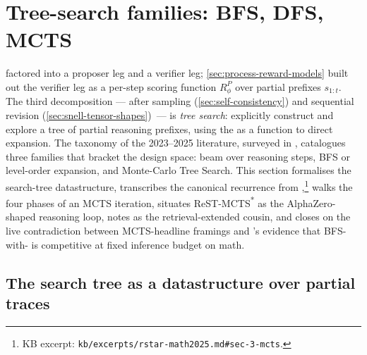 
\section{Tree-search families: BFS, DFS, MCTS}
\label{sec:tree-search}

 factored  into a
proposer leg and a verifier leg; \cref{sec:process-reward-models} built
out the verifier leg as a per-step scoring function $R^P_\phi$ over
partial prefixes $s_{1:t}$. The third decomposition --- after sampling
(\cref{sec:self-consistency}) and sequential revision
(\cref{sec:snell-tensor-shapes})~--- is \emph{tree search}: explicitly
construct and explore a tree of partial reasoning prefixes, using the
 as a  function to direct expansion. The taxonomy of the
2023--2025 literature, surveyed in
\citet{wei2025-tree-search-survey}, catalogues three
families that bracket the design space: beam over reasoning steps, BFS
or level-order expansion, and Monte-Carlo Tree Search. This section
formalises the search-tree datastructure, transcribes the canonical
 recurrence from
\citet{rstar-math2025},\footnote{KB excerpt:
\texttt{kb/excerpts/rstar-math2025.md\#sec-3-mcts}.} walks the four
phases of an MCTS iteration, situates ReST-MCTS\textsuperscript{*}
\citep{zhang2024-rest-mcts} as the AlphaZero-shaped reasoning loop,
notes  \citep{hu2025-mcts-rag} as the retrieval-extended
cousin, and closes on the live contradiction between MCTS-headline
framings and \citet[\S 5--6]{snell2024}'s evidence that BFS-with- is
competitive at fixed inference budget on math.

\subsection{The search tree as a datastructure over partial traces}
\label{sec:tree-datastructure}

